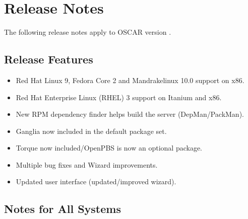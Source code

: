 %
%
%
%

\section{Release Notes}
\label{sec:release-notes}

The following release notes apply to OSCAR version \oscarversion.
\subsection{Release Features}
\label{subsec:release-features}

\begin{itemize}

\item Red Hat Linux 9, Fedora Core 2 and Mandrakelinux 10.0 support on x86.
\item Red Hat Enterprise Linux (RHEL) 3 support on Itanium and x86.
\item New RPM dependency finder helps build the server (DepMan/PackMan).
\item Ganglia now included in the default package set.
\item Torque now included/OpenPBS is now an optional package.
\item Multiple bug fixes and Wizard improvements.
\item Updated user interface (updated/improved wizard).

\end{itemize}

\subsection{Notes for All Systems}
\label{subsec:release-notes}

